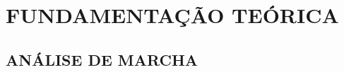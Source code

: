 \chapter[FUNDAMENTAÇÃO TEÓRICA]{\textbf {FUNDAMENTAÇÃO TEÓRICA}}

\section{ANÁLISE DE MARCHA}









\begin{comment}

\end{comment}
